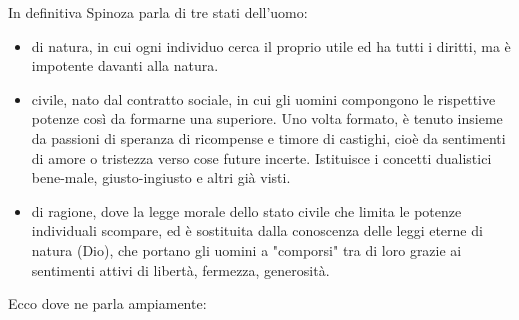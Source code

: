 In definitiva Spinoza parla di tre stati dell'uomo:
\begin{itemize}
	\item di natura, in cui ogni individuo cerca il proprio utile ed ha tutti i diritti, ma è impotente davanti alla natura.
	\item civile, nato dal contratto sociale, in cui gli uomini compongono le rispettive potenze così da formarne una superiore. Uno volta formato, è tenuto insieme da passioni di speranza di ricompense e timore di castighi, cioè da sentimenti di amore o tristezza verso cose future incerte. Istituisce i concetti dualistici bene-male, giusto-ingiusto e altri già visti.
	\item di ragione, dove la legge morale dello stato civile che limita le potenze individuali scompare, ed è sostituita dalla conoscenza delle leggi eterne di natura (Dio), che portano gli uomini a "comporsi" tra di loro grazie ai sentimenti attivi di libertà, fermezza, generosità.
\end{itemize}

Ecco dove ne parla ampiamente:

